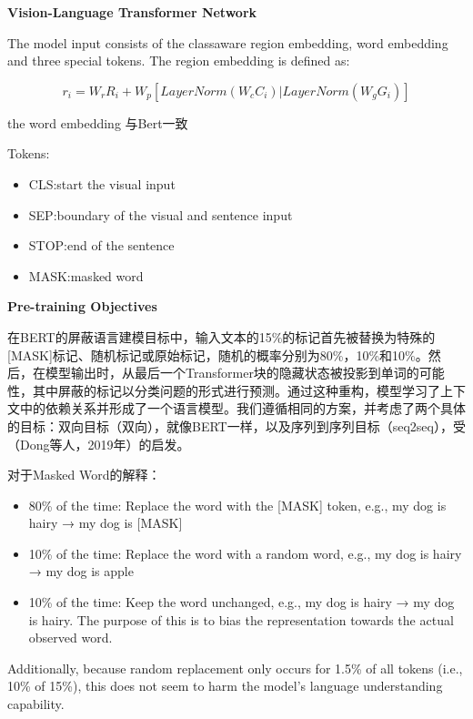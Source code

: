 \documentclass[a4paper]{article}
\begin{document}
\begin{sloppypar}
      \centerline{\textbf{Vision-Language Transformer Network}}

      The model input consists of the classaware region embedding, word embedding and three special tokens. The region embedding is defined as:

      \begin{equation}
            r_i=W_rR_i+W_p[LayerNorm(W_cC_i)|LayerNorm(W_gG_i)]
            \label{ri}
      \end{equation}


      the word embedding 与Bert一致

      Tokens:
      \begin{itemize}
            \item CLS:start the  visual input
            \item SEP:boundary of the visual and sentence input
            \item STOP:end of the sentence
            \item MASK:masked word
      \end{itemize}


      \centerline{\textbf{Pre-training Objectives}}
      在BERT的屏蔽语言建模目标中，输入文本的15\%的标记首先被替换为特殊的[MASK]标记、随机标记或原始标记，随机的概率分别为80\%，10\%和10\%。然后，在模型输出时，从最后一个Transformer块的隐藏状态被投影到单词的可能性，其中屏蔽的标记以分类问题的形式进行预测。通过这种重构，模型学习了上下文中的依赖关系并形成了一个语言模型。我们遵循相同的方案，并考虑了两个具体的目标：双向目标（双向），就像BERT一样，以及序列到序列目标（seq2seq），受（Dong等人，2019年）的启发。

      对于Masked Word的解释\cite{devlin2019bert}：
      \begin{itemize}
            \item 80\% of the time: Replace the word with the [MASK] token, e.g., my dog is hairy → my dog is [MASK]
            \item 10\% of the time: Replace the word with a random word, e.g., my dog is hairy → my dog is apple
            \item 10\% of the time: Keep the word unchanged, e.g., my dog is hairy → my dog is hairy. The purpose of this is to bias the representation towards the actual observed word.
      \end{itemize}
      Additionally, because random replacement only occurs for 1.5\% of all tokens (i.e., 10\% of 15\%), this does not seem to harm the model’s language understanding capability.\cite{devlin2019bert}
      \begin{table}[!htbp]
            \renewcommand\arraystretch{2}


\end{table}
\end{sloppypar}
\end{document}
